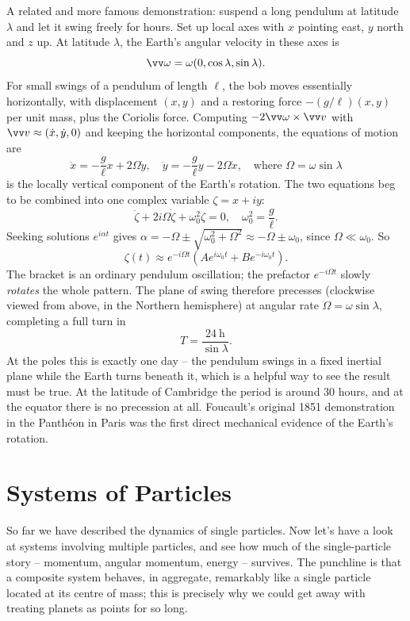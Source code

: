 \begin{example}
	A related and more famous demonstration: suspend a long pendulum at latitude $\lambda$ and let it swing freely for hours. Set up local axes with $x$ pointing east, $y$ north and $z$ up. At latitude $\lambda$, the Earth's angular velocity in these axes is
	$$
	\vv \omega = \omega(0, \cos\lambda, \sin \lambda).
	$$
	For small swings of a pendulum of length $\ell$, the bob moves essentially horizontally, with displacement $(x, y)$ and a restoring force $-(g/\ell)(x, y)$ per unit mass, plus the Coriolis force. Computing $-2\vv\omega \times \vv v$ with $\vv v \approx (\dot x, \dot y, 0)$ and keeping the horizontal components, the equations of motion are
	$$
	\ddot{x} = -\frac{g}{\ell}x + 2\Omega \dot{y}, \quad \ddot{y} = -\frac{g}{\ell}y - 2\Omega \dot{x}, \quad \text{where } \Omega = \omega \sin \lambda
	$$
	is the locally vertical component of the Earth's rotation. The two equations beg to be combined into one complex variable $\zeta = x + iy$:
	$$
	\ddot{\zeta} + 2i \Omega \dot{\zeta} + \omega_0^2 \zeta = 0, \quad \omega_0^2 = \frac{g}{\ell}.
	$$
	Seeking solutions $e^{i \alpha t}$ gives $\alpha = -\Omega \pm \sqrt{\omega_0^2 + \Omega^2} \approx -\Omega \pm \omega_0$, since $\Omega \ll \omega_0$. So
	$$
	\zeta(t) \approx e^{-i\Omega t}\left(A e^{i \omega_0 t} + B e^{-i\omega_0 t}\right).
	$$
	The bracket is an ordinary pendulum oscillation; the prefactor $e^{-i\Omega t}$ slowly \emph{rotates} the whole pattern. The plane of swing therefore precesses (clockwise viewed from above, in the Northern hemisphere) at angular rate $\Omega = \omega \sin\lambda$, completing a full turn in
	$$
	T = \frac{\SI{24}{\hour}}{\sin \lambda}.
	$$
	At the poles this is exactly one day -- the pendulum swings in a fixed inertial plane while the Earth turns beneath it, which is a helpful way to see the result must be true. At the latitude of Cambridge the period is around $30$ hours, and at the equator there is no precession at all. Foucault's original 1851 demonstration in the Panthéon in Paris was the first direct mechanical evidence of the Earth's rotation.
\end{example}


\section{Systems of Particles} \label{dr-sec:systems}

So far we have described the dynamics of single particles. Now let's have a look at systems involving multiple particles, and see how much of the single-particle story -- momentum, angular momentum, energy -- survives. The punchline is that a composite system behaves, in aggregate, remarkably like a single particle located at its centre of mass; this is precisely why we could get away with treating planets as points for so long.

